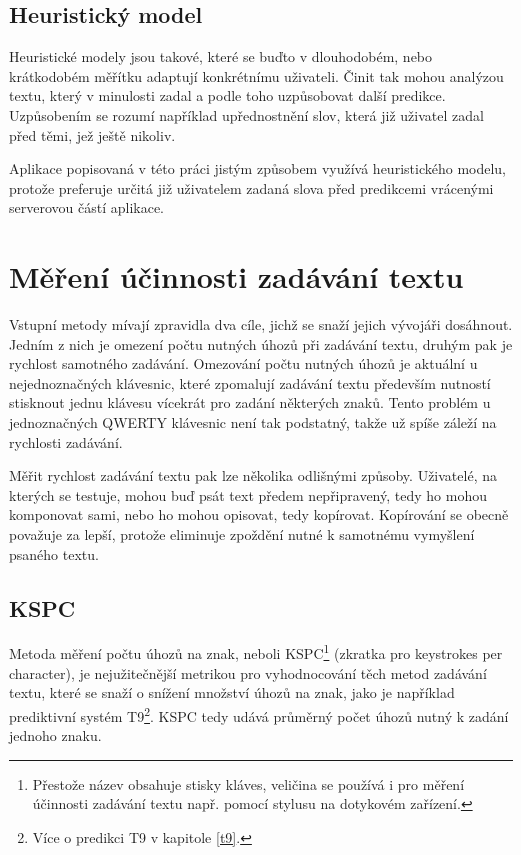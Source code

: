\documentclass[a4paper,11pt]{article}
\begin{document}
\subsection{Heuristický model}

Heuristické modely jsou takové, které se buďto v dlouhodobém, nebo krátkodobém měřítku adaptují konkrétnímu uživateli. Činit tak mohou analýzou textu, který v minulosti zadal a podle toho uzpůsobovat další predikce. Uzpůsobením se rozumí například upřednostnění slov, která již uživatel zadal před těmi, jež ještě nikoliv. \parencite[5235]{ghayoomi2009overview}

Aplikace popisovaná v této práci jistým způsobem využívá heuristického modelu, protože preferuje určitá již uživatelem zadaná slova před predikcemi vrácenými serverovou částí aplikace.

\section{Měření účinnosti zadávání textu}

Vstupní metody mívají zpravidla dva cíle, jichž se snaží jejich vývojáři dosáhnout. Jedním z nich je omezení počtu nutných úhozů při zadávání textu, druhým pak je rychlost samotného zadávání. Omezování počtu nutných úhozů je aktuální u nejednoznačných klávesnic, které zpomalují zadávání textu především nutností stisknout jednu klávesu vícekrát pro zadání některých znaků. Tento problém u jednoznačných QWERTY klávesnic není tak podstatný, takže už spíše záleží na rychlosti zadávání.

Měřit rychlost zadávání textu pak lze několika odlišnými způsoby. Uživatelé, na kterých se testuje, mohou buď psát text předem nepřipravený, tedy ho mohou komponovat sami, nebo ho mohou opisovat, tedy kopírovat. Kopírování se obecně považuje za lepší, protože eliminuje zpoždění nutné k samotnému vymyšlení psaného textu. \parencite[2]{tarvainen2010beginner} %

\subsection{KSPC}

Metoda měření počtu úhozů na znak, neboli KSPC\footnote{Přestože název obsahuje stisky kláves, veličina se používá i pro měření účinnosti zadávání textu např. pomocí stylusu na dotykovém zařízení.} (zkratka pro keystrokes per character), je nejužitečnější metrikou pro vyhodnocování těch metod zadávání textu, které se snaží o snížení množství úhozů na znak, jako  je například prediktivní systém T9\footnote{Více o predikci T9 v kapitole \ref{t9}.}. KSPC tedy udává průměrný počet úhozů nutný k zadání jednoho znaku.
\end{document}

